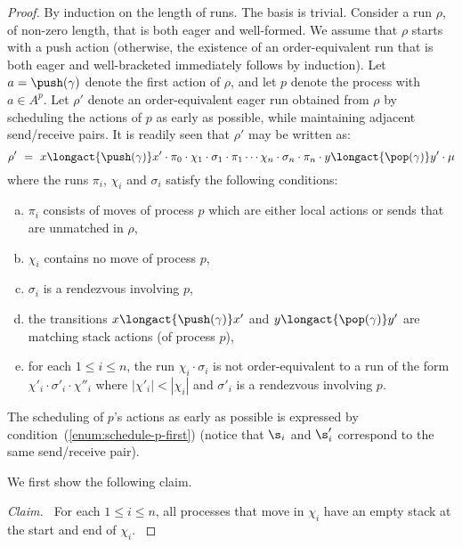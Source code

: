 \documentclass{LMCS}
\newenvironment{claim}{\medskip\noindent\textit{Claim.\ }}{\medskip}
\begin{document}
\begin{proof}
  By induction on the length of runs.
  The basis is trivial.
  Consider a run $\rho$, of non-zero length, that is both eager and well-formed.
  We assume that $\rho$ starts with a push action (otherwise, the existence of an order-equivalent run that is both eager and well-bracketed immediately follows by induction).
  Let $a=\push(\gamma)$ denote the first action of $\rho$, and let $p$ denote the process with $a \in A^p$.
Let $\rho'$ denote an order-equivalent eager run obtained from $\rho$ by scheduling the actions of $p$ as early as possible, while maintaining adjacent send/receive pairs.
  It is readily seen that $\rho'$ may be written as:
$$
  \rho' \ = \ x \longact{\push(\gamma)} x' \cdot \pi_0 \cdot \chi_1 \cdot \sigma_1 \cdot \pi_1 \cdots \chi_n \cdot \sigma_n \cdot \pi_n \cdot y \longact{\pop(\gamma)} y' \cdot \mu
  $$
  where the runs $\pi_i$, $\chi_i$ and $\sigma_i$ satisfy the
  following conditions:
  \begin{enumerate}[(a)]
  \item\label{enum:decomp-only-p}
    $\pi_i$ consists of moves of process $p$ which are either
    local actions or
    sends that are unmatched in $\rho$,
  \item\label{enum:decomp-only-not-p}
   $\chi_i$ contains no move of process $p$,
  \item\label{enum:decomp-sync}
   $\sigma_i$ is a rendezvous involving $p$,
  \item\label{enum:decomp-wf}
the transitions $x \longact{\push(\gamma)}
  x'$ and $y \longact{\pop(\gamma)} y'$ are matching stack actions (of
  process $p$), 
  \item\label{enum:schedule-p-first}
    for each $1 \leq i \leq n$, the run $\chi_i \cdot \sigma_i$ is not
    order-equivalent to a run of the form $\chi'_i \cdot \sigma'_i
    \cdot \chi''_i$ where $|\chi'_i| < |\chi_i|$ and $\sigma'_i$ is a
    rendezvous involving $p$.
\end{enumerate}
The scheduling of $p$'s actions as early as possible is expressed by
  condition~(\ref{enum:schedule-p-first}) (notice that $\s_i$ and
  $\s'_i$ correspond to the same send/receive pair). 
  
  \noindent
  We first show the following claim.

  \begin{claim}
    For each $1 \leq i \leq n$, all processes that move in $\chi_i$
    have an empty stack at the start and end of $\chi_i$. 
  \end{claim}


\end{proof}
\end{document}
